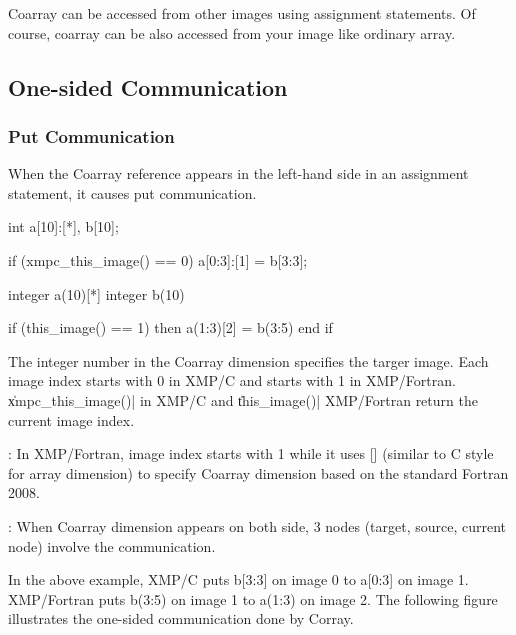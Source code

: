 \noindent\hrulefill

Coarray can be accessed from other images using assignment
statements. Of course, coarray can be also accessed from your image like
ordinary array.

\subsection{One-sided Communication}

\subsubsection{Put Communication}

When the Coarray reference appears in the left-hand side in an
assignment statement, it causes put communication.

\begin{XCexample}
int a[10]:[*], b[10];

if (xmpc_this_image() == 0)
  a[0:3]:[1] = b[3:3];
\end{XCexample}

\begin{XFexample}
integer a(10)[*]
integer b(10)

if (this_image() == 1) then
  a(1:3)[2] = b(3:5)
end if
\end{XFexample}

The integer number in the Coarray dimension specifies the targer
image. Each image index starts with 0 in XMP/C and starts with 1 in
XMP/Fortran. \|xmpc_this_image()| in XMP/C and \|this_image()| XMP/Fortran
return the current image index.

\noindent\hrulefill

: In XMP/Fortran, image index starts with 1 while it
uses [] (similar to C 
style for array dimension) to specify Coarray dimension based on the
standard Fortran 2008.

\noindent\hrulefill

\noindent\hrulefill

: When Coarray dimension appears on both side, 3
nodes (target, source, current node) involve the communication.

\noindent\hrulefill

In the above example, XMP/C puts b[3:3] on image 0 to a[0:3] on image
1. XMP/Fortran puts b(3:5) on image 1 to a(1:3) on image 2. The
following figure illustrates the one-sided communication done by
Corray.

